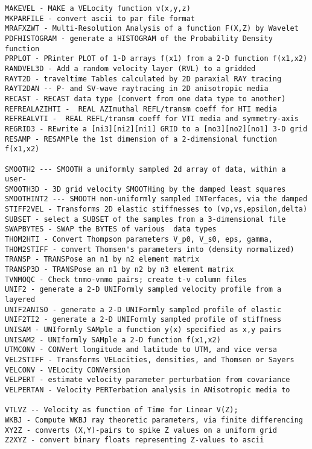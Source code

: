 {{\begin{verbatim}
MAKEVEL - MAKE a VELocity function v(x,y,z)				
MKPARFILE - convert ascii to par file format 				
MRAFXZWT - Multi-Resolution Analysis of a function F(X,Z) by Wavelet	
PDFHISTOGRAM - generate a HISTOGRAM of the Probability Density function
PRPLOT - PRinter PLOT of 1-D arrays f(x1) from a 2-D function f(x1,x2)
RANDVEL3D - Add a random velocity layer (RVL) to a gridded             
RAYT2D - traveltime Tables calculated by 2D paraxial RAY tracing	
RAYT2DAN -- P- and SV-wave raytracing in 2D anisotropic media		
RECAST - RECAST data type (convert from one data type to another)	
REFREALAZIHTI -  REAL AZImuthal REFL/transm coeff for HTI media 	
REFREALVTI -  REAL REFL/transm coeff for VTI media and symmetry-axis	
REGRID3 - REwrite a [ni3][ni2][ni1] GRID to a [no3][no2][no1] 3-D grid
RESAMP - RESAMPle the 1st dimension of a 2-dimensional function f(x1,x2)

SMOOTH2 --- SMOOTH a uniformly sampled 2d array of data, within a user-
SMOOTH3D - 3D grid velocity SMOOTHing by the damped least squares	
SMOOTHINT2 --- SMOOTH non-uniformly sampled INTerfaces, via the damped
STIFF2VEL - Transforms 2D elastic stiffnesses to (vp,vs,epsilon,delta) 
SUBSET - select a SUBSET of the samples from a 3-dimensional file	
SWAPBYTES - SWAP the BYTES of various  data types			
THOM2HTI - Convert Thompson parameters V_p0, V_s0, eps, gamma,	
THOM2STIFF - convert Thomsen's parameters into (density normalized)	
TRANSP - TRANSPose an n1 by n2 element matrix				
TRANSP3D - TRANSPose an n1 by n2 by n3 element matrix			
TVNMOQC - Check tnmo-vnmo pairs; create t-v column files           
UNIF2 - generate a 2-D UNIFormly sampled velocity profile from a layered
UNIF2ANISO - generate a 2-D UNIFormly sampled profile of elastic	
UNIF2TI2 - generate a 2-D UNIFormly sampled profile of stiffness 	
UNISAM - UNIformly SAMple a function y(x) specified as x,y pairs	
UNISAM2 - UNIformly SAMple a 2-D function f(x1,x2)			
UTMCONV - CONVert longitude and latitude to UTM, and vice versa       
VEL2STIFF - Transforms VELocities, densities, and Thomsen or Sayers   
VELCONV - VELocity CONVersion					
VELPERT - estimate velocity parameter perturbation from covariance 	
VELPERTAN - Velocity PERTerbation analysis in ANisotropic media to    

VTLVZ -- Velocity as function of Time for Linear V(Z);		
WKBJ - Compute WKBJ ray theoretic parameters, via finite differencing	
XY2Z - converts (X,Y)-pairs to spike Z values on a uniform grid	
Z2XYZ - convert binary floats representing Z-values to ascii	


\end{verbatim}}}
